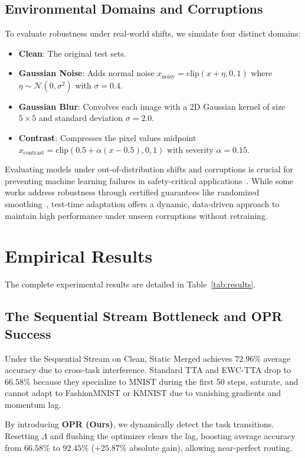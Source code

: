 \documentclass{article}
\theoremstyle{plain}
\theoremstyle{definition}
\theoremstyle{remark}
\begin{document}
\subsection{Environmental Domains and Corruptions}
To evaluate robustness under real-world shifts, we simulate four distinct domains:
\begin{itemize}
    \item \textbf{Clean}: The original test sets.
    \item \textbf{Gaussian Noise}: Adds normal noise $x_{\text{noisy}} = \text{clip}(x + \eta, 0, 1)$ where $\eta \sim \mathcal{N}(0, \sigma^2)$ with $\sigma = 0.4$.
    \item \textbf{Gaussian Blur}: Convolves each image with a 2D Gaussian kernel of size $5 \times 5$ and standard deviation $\sigma = 2.0$.
    \item \textbf{Contrast}: Compresses the pixel values midpoint $x_{\text{contrast}} = \text{clip}(0.5 + \alpha(x - 0.5), 0, 1)$ with severity $\alpha = 0.15$.
\end{itemize}
Evaluating models under out-of-distribution shifts and corruptions is crucial for preventing machine learning failures in safety-critical applications~\cite{subbaswamy2019preventing}. While some works address robustness through certified guarantees like randomized smoothing~\cite{cohen2019certified}, test-time adaptation offers a dynamic, data-driven approach to maintain high performance under unseen corruptions without retraining.

\section{Empirical Results}
\label{sec:results}
The complete experimental results are detailed in Table~\ref{tab:results}.

\subsection{The Sequential Stream Bottleneck and OPR Success}
Under the Sequential Stream on Clean, Static Merged achieves $72.96\%$ average accuracy due to cross-task interference. Standard TTA and EWC-TTA drop to $66.58\%$ because they specialize to MNIST during the first 50 steps, saturate, and cannot adapt to FashionMNIST or KMNIST due to vanishing gradients and momentum lag.

By introducing \textbf{OPR (Ours)}, we dynamically detect the task transitions. Resetting $\Lambda$ and flushing the optimizer clears the lag, boosting average accuracy from $66.58\%$ to $\mathbf{92.45\%}$ ($+25.87\%$ absolute gain), allowing near-perfect routing.
\end{document}

